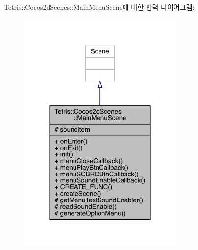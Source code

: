 Tetris\+:\+:Cocos2d\+Scenes\+:\+:Main\+Menu\+Scene에 대한 협력 다이어그램\+:
\nopagebreak
\begin{figure}[H]
\begin{center}
\leavevmode
\includegraphics[width=234pt]{class_tetris_1_1_cocos2d_scenes_1_1_main_menu_scene__coll__graph}
\end{center}
\end{figure}
